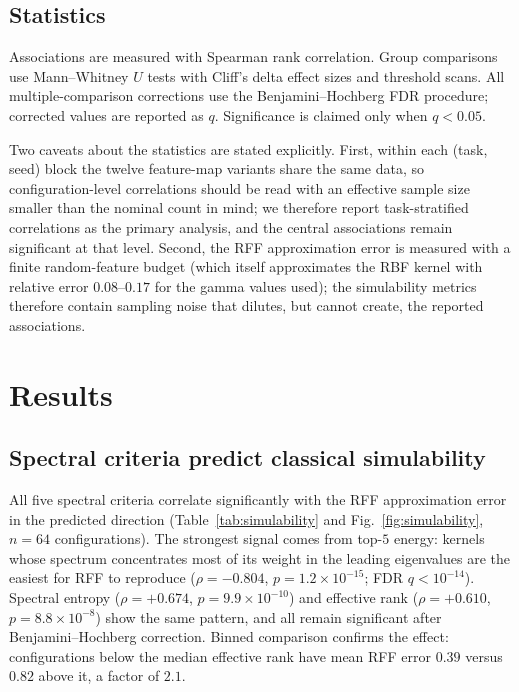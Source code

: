\documentclass[a4paper,unpublished,onecolumn,nopdfoutputerror,12pt]{quantumarticle}
\begin{document}
\subsection{Statistics}
\label{sec:methods-stats}

Associations are measured with Spearman rank correlation. Group comparisons use
Mann--Whitney $U$ tests with Cliff's delta effect sizes and threshold scans. All
multiple-comparison corrections use the Benjamini--Hochberg FDR procedure; corrected
values are reported as $q$. Significance is claimed only when $q<0.05$.

Two caveats about the statistics are stated explicitly. First, within each
(task, seed) block the twelve feature-map variants share the same data, so
configuration-level correlations should be read with an effective sample size
smaller than the nominal count in mind; we therefore report task-stratified
correlations as the primary analysis, and the central associations remain
significant at that level. Second, the RFF approximation error is measured with
a finite random-feature budget (which itself approximates the RBF kernel with
relative error $0.08$--$0.17$ for the gamma values used); the simulability
metrics therefore contain sampling noise that dilutes, but cannot create,
the reported associations.

\section{Results}
\label{sec:results}

\subsection{Spectral criteria predict classical simulability}
\label{sec:simulability}

All five spectral criteria correlate significantly with the RFF approximation error in the
predicted direction (Table~\ref{tab:simulability} and Fig.~\ref{fig:simulability},
$n=64$ configurations). The strongest signal comes from top-$5$ energy: kernels whose
spectrum concentrates most of its weight in the leading eigenvalues are the easiest for
RFF to reproduce ($\rho=-0.804$, $p=1.2\times10^{-15}$; FDR $q<10^{-14}$). Spectral
entropy ($\rho=+0.674$, $p=9.9\times10^{-10}$) and effective rank ($\rho=+0.610$,
$p=8.8\times10^{-8}$) show the same pattern, and all remain significant after
Benjamini--Hochberg correction. Binned comparison confirms the effect: configurations
below the median effective rank have mean RFF error $0.39$ versus $0.82$ above it, a
factor of $2.1$.
\end{document}

